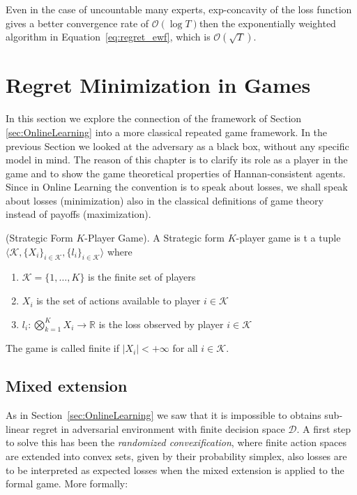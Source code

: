 Even in the case of uncountable many experts, exp-concavity of the loss function gives a better convergence rate of $\mathcal O(\log T)$then the exponentially weighted algorithm in Equation~\eqref{eq:regret_ewf}, which is $\mathcal O(\sqrt T)$.

\section{Regret Minimization in Games}
\label{sec:GT}
In this section we explore the connection of the framework of Section \ref{sec:OnlineLearning} into a more classical repeated game framework. In the previous Section we looked at the adversary as a black box, without any specific model in mind. The reason of this chapter is to clarify its role as a player in the game and to show the game theoretical properties of Hannan-consistent agents. Since in Online Learning the convention is to speak about losses, we shall speak about losses (minimization) also in the classical definitions of game theory instead of payoffs (maximization).

\begin{definition}(Strategic Form $K$-Player Game).\label{def:Game}
    A Strategic form $K$-player game is t a tuple $\langle\mathcal K,\{X_i\}_{i\in\mathcal K},\{l_i\}_{i\in\mathcal K}\rangle$ where
    \begin{enumerate}
        \item $\mathcal K=\{1,\ldots,K\}$ is the finite set of players
        \item $X_i$ is the set of actions available to player $i\in\mathcal K$
        \item $l_i:\bigotimes\limits_{k=1}^KX_i\to\mathbb R$ is the loss observed by player $i\in\mathcal K$
    \end{enumerate}
	The game is called finite if $|X_i|<+\infty$ for all $i\in\mathcal K$.
\end{definition}


\subsection{Mixed extension}\label{sec:mixed}
As in Section~\ref{sec:OnlineLearning} we saw that it is impossible to obtains sub-linear regret in adversarial environment with finite decision space $\mathcal D$. A first step to solve this has been the \emph{randomized convexification}, where finite action spaces are extended into convex sets, given by their probability simplex, also losses are to be interpreted as expected losses when the mixed extension is applied to the formal game. More formally: 

